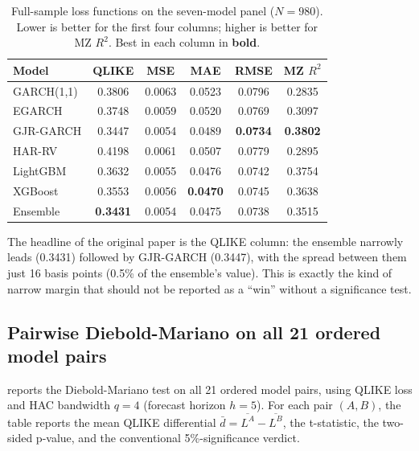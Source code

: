 \begin{table}[H]
\centering
\small
\setlength{\tabcolsep}{6pt}
\caption{Full-sample loss functions on the seven-model panel ($N=980$). Lower is better for the first four columns; higher is better for MZ $R^2$. Best in each column in \textbf{bold}.}
\label{tab:demo_full_sample}
\begin{tabular}{l c c c c c}
\toprule
\textbf{Model} & \textbf{QLIKE} & \textbf{MSE} & \textbf{MAE} & \textbf{RMSE} & \textbf{MZ $R^2$} \\
\midrule
GARCH(1,1)   & 0.3806 & 0.0063 & 0.0523 & 0.0796 & 0.2835 \\
EGARCH       & 0.3748 & 0.0059 & 0.0520 & 0.0769 & 0.3097 \\
GJR-GARCH    & 0.3447 & 0.0054 & 0.0489 & \textbf{0.0734} & \textbf{0.3802} \\
HAR-RV       & 0.4198 & 0.0061 & 0.0507 & 0.0779 & 0.2895 \\
LightGBM     & 0.3632 & 0.0055 & 0.0476 & 0.0742 & 0.3754 \\
XGBoost      & 0.3553 & 0.0056 & \textbf{0.0470} & 0.0745 & 0.3638 \\
Ensemble     & \textbf{0.3431} & 0.0054 & 0.0475 & 0.0738 & 0.3515 \\
\bottomrule
\end{tabular}
\end{table}

The headline of the original paper is the QLIKE column: the ensemble narrowly leads (0.3431) followed by GJR-GARCH (0.3447), with the spread between them just 16 basis points (0.5\% of the ensemble's value). This is exactly the kind of narrow margin that should not be reported as a ``win'' without a significance test.

\subsection{Pairwise Diebold-Mariano on all 21 ordered model pairs}

 reports the Diebold-Mariano test on all 21 ordered model pairs, using QLIKE loss and HAC bandwidth $q = 4$ (forecast horizon $h = 5$). For each pair $(A, B)$, the table reports the mean QLIKE differential $\bar d = \overline{L^A} - \overline{L^B}$, the t-statistic, the two-sided p-value, and the conventional 5\%-significance verdict.

